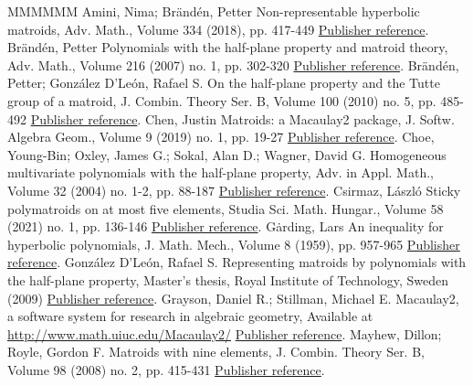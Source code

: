 \begin{thebibliography}{MMMMMM}
 Amini, Nima; Brändén, Petter Non-representable hyperbolic matroids, Adv. Math., Volume 334 (2018), pp. 417-449 \href{https://alco.centre-mersenne.org/articles/10.5802/alco.399/#NonPappus}{Publisher reference}.
 Brändén, Petter Polynomials with the half-plane property and matroid theory, Adv. Math., Volume 216 (2007) no. 1, pp. 302-320 \href{https://alco.centre-mersenne.org/articles/10.5802/alco.399/#BrandenHPP}{Publisher reference}.
 Brändén, Petter; González D’León, Rafael S. On the half-plane property and the Tutte group of a matroid, J. Combin. Theory Ser. B, Volume 100 (2010) no. 5, pp. 485-492 \href{https://alco.centre-mersenne.org/articles/10.5802/alco.399/#BrandenDLeon}{Publisher reference}.
 Chen, Justin Matroids: a Macaulay2 package, J. Softw. Algebra Geom., Volume 9 (2019) no. 1, pp. 19-27 \href{https://alco.centre-mersenne.org/articles/10.5802/alco.399/#MatroidsArticle}{Publisher reference}.
 Choe, Young-Bin; Oxley, James G.; Sokal, Alan D.; Wagner, David G. Homogeneous multivariate polynomials with the half-plane property, Adv. in Appl. Math., Volume 32 (2004) no. 1-2, pp. 88-187 \href{https://alco.centre-mersenne.org/articles/10.5802/alco.399/#HPPlong}{Publisher reference}.
 Csirmaz, László Sticky polymatroids on at most five elements, Studia Sci. Math. Hungar., Volume 58 (2021) no. 1, pp. 136-146 \href{https://alco.centre-mersenne.org/articles/10.5802/alco.399/#stickypolymatroids}{Publisher reference}.
 Gȧrding, Lars An inequality for hyperbolic polynomials, J. Math. Mech., Volume 8 (1959), pp. 957-965 \href{https://alco.centre-mersenne.org/articles/10.5802/alco.399/#gar}{Publisher reference}.
 González D’León, Rafael S. Representing matroids by polynomials with the half-plane property, Master’s thesis, Royal Institute of Technology, Sweden (2009) \href{https://alco.centre-mersenne.org/articles/10.5802/alco.399/#masterleon}{Publisher reference}.
 Grayson, Daniel R.; Stillman, Michael E. Macaulay2, a software system for research in algebraic geometry, Available at \url{http://www.math.uiuc.edu/Macaulay2/} \href{https://alco.centre-mersenne.org/articles/10.5802/alco.399/#M2}{Publisher reference}.
 Mayhew, Dillon; Royle, Gordon F. Matroids with nine elements, J. Combin. Theory Ser. B, Volume 98 (2008) no. 2, pp. 415-431 \href{https://alco.centre-mersenne.org/articles/10.5802/alco.399/#ninematroids}{Publisher reference}.

\end{thebibliography}
